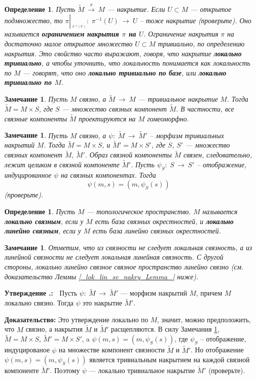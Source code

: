 \documentclass[12pt]{book}
\newcommand{\arrow}{{\:\longrightarrow\:}}
\newcommand{\restrict}[1]{{\left|_{{\phantom{|}\!\!}_{#1}}\right.}}
\def\endproof{\hbox{\vrule width 5pt height 5pt depth 0pt}}
\theoremstyle{upshape}
\newtheorem{zadacha}{Задача}[chapter]
\theoremstyle{generic}
\newtheorem{opredelenie}[teorema]{Определение}
\newtheorem{remark}[teorema]{Замечание}
\def\замечание{\begin{remark}}
\def\еза{\end{remark}}
\theoremstyle{upshapenonumber}
\newtheorem{ukazanie}{Указание}[section]
\newcommand{\следствие}{%
     \refstepcounter{teorema}
     {\noindent\bf Следствие \thechapter.\arabic{teorema}:\ }}
\newcommand{\пример}{%
     \refstepcounter{teorema}
     {\noindent\bf Пример \thechapter.\arabic{teorema}:\ }}
\newcommand{\лемма}{%
     \refstepcounter{teorema}
     {\noindent\bf Лемма \thechapter.\arabic{teorema}:\ }}
\newcommand{\теорема}{%
     \refstepcounter{teorema}
     {\noindent\bf Теорема \thechapter.\arabic{teorema}:\ }}
\newcommand{\утверждение}{%
     \refstepcounter{teorema}
     {\noindent\bf Утверждение \thechapter.\arabic{teorema}:\ }}
\def\хфилл{\hfill}
\def\ноиндент{\noindent}
\def\бф{\bf}
\def\ем{\em}
\def\задача{\begin{zadacha}}
\def\ез{\end{zadacha}}
\def\указание{\begin{ukazanie}}
\def\еу{\end{ukazanie}}
\def\определение{\begin{opredelenie}}
\def\ео{\end{opredelenie}}
\def\енум{\begin{enumerate}}
\def\ее{\end{enumerate}}
\begin{document}
\определение 
Пусть $\tilde M \stackrel \pi \arrow M$ --- накрытие.
Если $U \subset M$ --- открытое подмножество, то
$\pi\restrict{\pi^{-1}(U)}:\; \pi^{-1}(U)\arrow U$ --
тоже накрытие (проверьте). Оно называется
{\бф ограничением накрытия $\pi$ на $U$}.
Ограничение накрытия $\pi$ на достаточно
малое открытое множество $U \subset M$ тривиально, по 
определению накрытия. Это свойство часто выражают,
говоря, что накрытие {\бф локально тривиально},
а чтобы уточнить, что локальность понимается
как локальность по $M$ --- говорят, что
оно {\бф локально тривиально по базе},
или {\бф локально тривиально по $M$}.
\ео

\замечание
Пусть $M$ связно, а $\tilde M \arrow M$ --- тривиальное накрытие
$M$. Тогда $\tilde M = M \times S$, где $S$ --- множество
связных компонент $\tilde M$. В частности, 
все связные компоненты $\tilde M$ проектируются
на $M$ гомеоморфно.
\еза

\замечание\label{_morfizm_rasshche_Zamechanie_}
Пусть $M$ связно, а $\psi:\; \tilde M \arrow \tilde M'$ --
морфизм тривиальных накрытий $M$. Тогда 
$\tilde M = M \times S$, и $\tilde M'= M \times S'$,
где $S$, $S'$ --- множество связных компонент
$\tilde M$, $\tilde M'$.
Образ связной компоненты $\tilde M$ 
связен, следовательно, лежит целиком в связной
компоненте $\tilde M'$. Пусть $\psi_S:\; S \arrow S'$
-- отображение, индуцированное $\psi$ на связных компонентах.
Тогда
\[
\psi(m, s) = (m, \psi_S(s))
\]
(проверьте).
\еза


\определение
Пусть $M$ --- топологическое пространство. $M$ называется
{\бф локально связным}, если у $M$ есть
база связных окрестностей, и {\бф локально линейно 
связным}, если у $M$ есть база линейно
связных окрестностей.
\ео

\замечание
Отметим, что из связности не следует
локальная связность, а из линейной связности
не следует локальная линейная связность. 
С другой стороны, локально линейно связное
связное пространство линейно связно
(см. доказательство Леммы \ref{_lok_lin_sv_nakry_Lemma_} ниже).
\еза


\утверждение
Пусть $\psi:\; \tilde M \arrow \tilde M'$ --- морфизм
накрытий $M$, причем $M$ локально связно. 
Тогда $\psi$ это накрытие  $\tilde M'$. 


\хфилл

\ноиндент
{\бф Доказательство:} Это утверждение локально по $M$,
значит, можно предположить, что $M$ связно,
а накрытия $\tilde M$ и $\tilde M'$ расщепляются.
В силу Замечания \ref{_morfizm_rasshche_Zamechanie_}, 
$\tilde M = M \times S$, $\tilde M'= M \times S'$,
a $\psi(m, s) = (m, \psi_S(s))$, где $\psi_S$ --
отображение, индуцированое $\psi$ на множестве 
компонент связности $\tilde M$ и $\tilde M'$.
Но отображение $\psi(m, s) = (m, \psi_S(s))$
является тривиальным накрытием на каждой
связной компоненте $\tilde M'$. Поэтому 
$\psi$ --- локально тривиальное накрытие 
$\tilde M'$ (проверьте). 
\endproof
\end{document}

